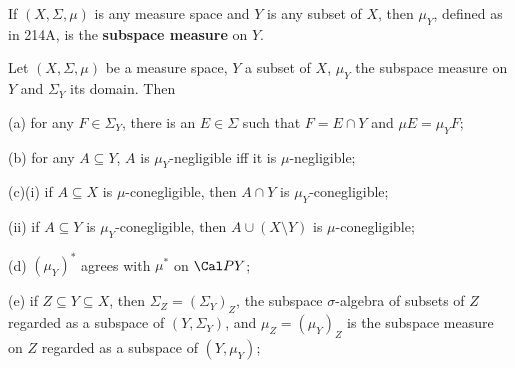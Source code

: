 
 If $(X,\Sigma,\mu)$ is any measure space and
$Y$ is any subset of $X$, then $\mu_Y$, defined as in 214A, is the {\bf
subspace measure} on $Y$.


 Let $(X,\Sigma,\mu)$ be a measure space, $Y$ a
subset of $X$, $\mu_Y$ the subspace measure on $Y$ and $\Sigma_Y$ its
domain.  Then

(a) for any $F\in\Sigma_Y$, there is an $E\in\Sigma$ such that
$F=E\cap Y$ and $\mu E=\mu_YF$;

(b) for any $A\subseteq Y$, $A$ is $\mu_Y$-negligible iff it is
$\mu$-negligible;

(c)(i) if $A\subseteq X$ is $\mu$-conegligible, then $A\cap Y$
is $\mu_Y$-conegligible;

\quad (ii) if $A\subseteq Y$ is
$\mu_Y$-conegligible, then $A\cup(X\setminus Y)$ is $\mu$-conegligible;

(d) $(\mu_Y)^*$ agrees with $\mu^*$ on $\Cal PY$;

(e) if $Z\subseteq Y\subseteq X$, then
$\Sigma_Z=(\Sigma_Y)_Z$, the subspace $\sigma$-algebra of
subsets of $Z$ regarded as a subspace of $(Y,\Sigma_Y)$, and
$\mu_Z=(\mu_Y)_Z$ is the subspace measure on $Z$
regarded as a subspace of $(Y,\mu_Y)$;

